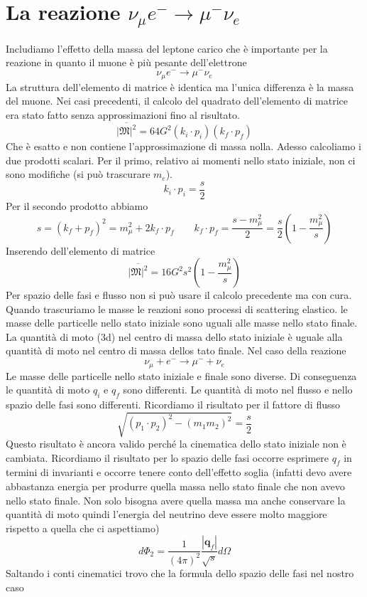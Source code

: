 \section{La reazione $\nu_\mu e^-\to\mu^-\nu_e$}
Includiamo l'effetto della massa del leptone carico che è importante per la reazione in quanto il muone è più pesante dell'elettrone
$$
\nu_\mu e^-\to\mu^-\nu_e
$$
La struttura dell'elemento di matrice è identica ma l'unica differenza è la massa del muone. Nei casi precedenti, il calcolo del quadrato dell'elemento di matrice era stato fatto senza approssimazioni fino al risultato.
$$
\overline{|\mathfrak{M}|^2} = 64G^2 (k_i \cdot p_i)(k_f \cdot p_f)
$$
Che è esatto e non contiene l'approssimazione di massa nolla. Adesso calcoliamo i due prodotti scalari. Per il primo, relativo ai momenti nello stato iniziale, non ci sono modifiche (si può trascurare $m_e$). 
$$
k_i \cdot p_i = \frac{s}{2}
$$
Per il secondo prodotto abbiamo
$$
s = (k_f + p_f)^2 = m_\mu^2 + 2k_f \cdot p_f \qquad k_f \cdot p_f = \frac{s - m_\mu^2}{2} = \frac{s}{2} \left( 1 - \frac{m_\mu^2}{s} \right)
$$
Inserendo dell'elemento di matrice
$$
\overline{|\mathfrak{M}|^2} = 16G^2 s^2 \left( 1 - \frac{m_\mu^2}{s} \right)
$$
Per spazio delle fasi e flusso non si può usare il calcolo precedente ma con cura. Quando trascuriamo le masse le reazioni sono processi di scattering elastico. le masse delle particelle nello stato iniziale sono uguali alle masse nello stato finale. La quantità di moto (3d) nel centro di massa dello stato iniziale è uguale alla quantità di moto nel centro di massa dellos tato finale. Nel caso della reazione
$$
\nu_\mu + e^- \to \mu^- + \nu_e
$$
Le masse delle particelle nello stato iniziale e finale sono diverse. Di conseguenza le quantità di moto $q_i$ e $q_f$ sono differenti. Le quantità di moto nel flusso e nello spazio delle fasi sono differenti. Ricordiamo il risultato per il fattore di flusso
$$
\sqrt{(p_1 \cdot p_2)^2 - (m_1m_2)^2} = \frac{s}{2}
$$
Questo risultato è ancora valido perché la cinematica dello stato iniziale non è cambiata. Ricordiamo il risultato per lo spazio delle fasi occorre esprimere $q_f$ in termini di invarianti e occorre tenere conto dell'effetto soglia (infatti devo avere abbastanza energia per produrre quella massa nello stato finale che non avevo nello stato finale. Non solo bisogna avere quella massa ma anche conservare la quantità di moto quindi l'energia del neutrino deve essere molto maggiore rispetto a quella che ci aspettiamo)
$$
d\Phi_2 = \frac{1}{(4\pi)^2} \frac{|\mathbf{q}_f|}{\sqrt{s}} d\Omega
$$
Saltando i conti cinematici trovo che la formula dello spazio delle fasi nel nostro caso
